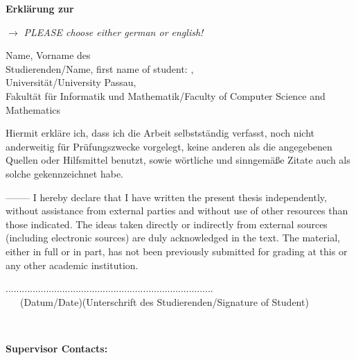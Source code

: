 
\thispagestyle{empty}

\begin{center}
\huge{\textbf{Erklärung zur \thesistype}}
\end{center}

$\rightarrow$ \textit{PLEASE choose either german or english!}

\vspace{2cm}
Name, Vorname des\\Studierenden/Name, first name of student: \hspace{4cm} \authornamelast,~\authornamefirst~\authornamemiddle
\vspace{2cm}
\\Universität/University Passau,\\
Fakultät für Informatik und Mathematik/Faculty of Computer Science and Mathematics
\vspace{3cm}
\begin{center}
Hiermit erkläre ich, dass ich die Arbeit selbstständig verfasst, noch nicht anderweitig
für Prüfungszwecke vorgelegt, keine anderen als die angegebenen Quellen oder Hilfsmittel
benutzt, sowie wörtliche und sinngemäße Zitate auch als solche gekennzeichnet habe.

--------
\newline
I hereby declare that I have written the present thesis independently, without assistance 
from external parties and without use of other resources than those indicated. The ideas 
taken directly or indirectly from external sources (including electronic sources) are duly 
acknowledged in the text. The material, either in full or in part, has not been previously 
submitted for grading at this or any other academic institution.  


\end{center}
\vspace{5.5cm}
.........................\hfill....................................................\\
~~~(Datum/Date)\hfill(Unterschrift des Studierenden/Signature of Student)

\cleardoublepage
~
\vfill


{\bf{Supervisor Contacts:}} \smallskip \\
\contactprofone\\
\contactproftwo\\
\contactsupervisor\\

\cleardoublepage